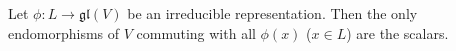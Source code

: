 Let $\phi: L \rightarrow \mathfrak{gl}(V)$ be an irreducible representation. Then the only endomorphisms of $V$ commuting with all $\phi(x)$ ($x \in L$) are the scalars.
